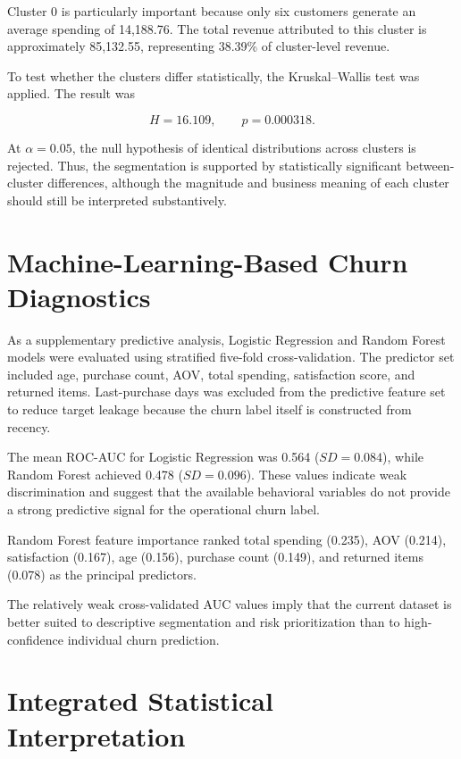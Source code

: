 \documentclass[11pt,a4paper]{article}
\begin{document}
Cluster 0 is particularly important because only six customers generate
an average spending of 14,188.76. The total revenue attributed to this
cluster is approximately 85,132.55, representing 38.39\% of cluster-level
revenue.

To test whether the clusters differ statistically, the Kruskal--Wallis
test was applied. The result was

\begin{equation}
H=16.109,\qquad p=0.000318.
\end{equation}

At $\alpha=0.05$, the null hypothesis of identical distributions across
clusters is rejected. Thus, the segmentation is supported by statistically
significant between-cluster differences, although the magnitude and
business meaning of each cluster should still be interpreted substantively.

\section{Machine-Learning-Based Churn Diagnostics}

As a supplementary predictive analysis, Logistic Regression and Random
Forest models were evaluated using stratified five-fold cross-validation.
The predictor set included age, purchase count, AOV, total spending,
satisfaction score, and returned items. Last-purchase days was excluded
from the predictive feature set to reduce target leakage because the
churn label itself is constructed from recency.

The mean ROC-AUC for Logistic Regression was 0.564
($SD=0.084$), while Random Forest achieved 0.478
($SD=0.096$). These values indicate weak discrimination and suggest that
the available behavioral variables do not provide a strong predictive
signal for the operational churn label.

Random Forest feature importance ranked total spending (0.235), AOV
(0.214), satisfaction (0.167), age (0.156), purchase count (0.149), and
returned items (0.078) as the principal predictors.

The relatively weak cross-validated AUC values imply that the current
dataset is better suited to descriptive segmentation and risk
prioritization than to high-confidence individual churn prediction.

\section{Integrated Statistical Interpretation}
\end{document}
